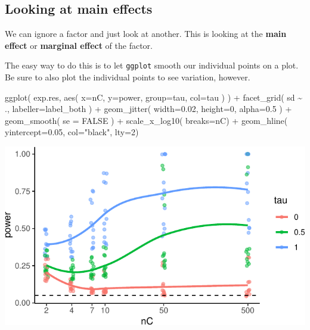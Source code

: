 \documentclass[
]{book}
\newenvironment{Shaded}{\begin{snugshade}}{\end{snugshade}}
\newcommand{\AttributeTok}[1]{\textcolor[rgb]{0.77,0.63,0.00}{#1}}
\newcommand{\ConstantTok}[1]{\textcolor[rgb]{0.00,0.00,0.00}{#1}}
\newcommand{\DecValTok}[1]{\textcolor[rgb]{0.00,0.00,0.81}{#1}}
\newcommand{\FloatTok}[1]{\textcolor[rgb]{0.00,0.00,0.81}{#1}}
\newcommand{\FunctionTok}[1]{\textcolor[rgb]{0.00,0.00,0.00}{#1}}
\newcommand{\NormalTok}[1]{#1}
\newcommand{\SpecialCharTok}[1]{\textcolor[rgb]{0.00,0.00,0.00}{#1}}
\newcommand{\StringTok}[1]{\textcolor[rgb]{0.31,0.60,0.02}{#1}}
\begin{document}
\hypertarget{looking-at-main-effects}{%
\subsection{Looking at main effects}\label{looking-at-main-effects}}

We can ignore a factor and just look at another. This is looking at the
\textbf{main effect} or \textbf{marginal effect} of the factor.

The easy way to do this is to let \texttt{ggplot} smooth our individual points on a
plot. Be sure to also plot the individual points to see variation, however.

\begin{Shaded}
\begin{Highlighting}[]
\FunctionTok{ggplot}\NormalTok{( exp.res, }\FunctionTok{aes}\NormalTok{( }\AttributeTok{x=}\NormalTok{nC, }\AttributeTok{y=}\NormalTok{power, }\AttributeTok{group=}\NormalTok{tau, }\AttributeTok{col=}\NormalTok{tau ) ) }\SpecialCharTok{+}
  \FunctionTok{facet\_grid}\NormalTok{( sd }\SpecialCharTok{\textasciitilde{}}\NormalTok{ ., }\AttributeTok{labeller=}\NormalTok{label\_both ) }\SpecialCharTok{+}
  \FunctionTok{geom\_jitter}\NormalTok{( }\AttributeTok{width=}\FloatTok{0.02}\NormalTok{, }\AttributeTok{height=}\DecValTok{0}\NormalTok{, }\AttributeTok{alpha=}\FloatTok{0.5}\NormalTok{ ) }\SpecialCharTok{+}
  \FunctionTok{geom\_smooth}\NormalTok{( }\AttributeTok{se =} \ConstantTok{FALSE}\NormalTok{ ) }\SpecialCharTok{+}
  \FunctionTok{scale\_x\_log10}\NormalTok{( }\AttributeTok{breaks=}\NormalTok{nC) }\SpecialCharTok{+}
  \FunctionTok{geom\_hline}\NormalTok{( }\AttributeTok{yintercept=}\FloatTok{0.05}\NormalTok{, }\AttributeTok{col=}\StringTok{"black"}\NormalTok{, }\AttributeTok{lty=}\DecValTok{2}\NormalTok{)}
\end{Highlighting}
\end{Shaded}

\begin{center}\includegraphics[width=0.75\linewidth]{Designing-Simulations-in-R_files/figure-latex/plotPool-1} \end{center}
\end{document}
